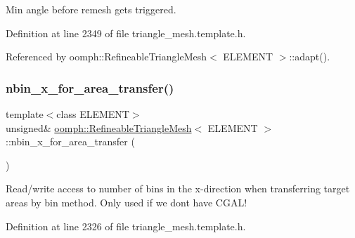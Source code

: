 Min angle before remesh gets triggered. 



Definition at line 2349 of file triangle\+\_\+mesh.\+template.\+h.



Referenced by oomph\+::\+Refineable\+Triangle\+Mesh$<$ E\+L\+E\+M\+E\+N\+T $>$\+::adapt().

\mbox{\label{classoomph_1_1RefineableTriangleMesh_a6c52f0bc155980b2c36fb867ce9ec2d7}} 
\subsubsection{\texorpdfstring{nbin\+\_\+x\+\_\+for\+\_\+area\+\_\+transfer()}{nbin\_x\_for\_area\_transfer()}}
{\footnotesize\ttfamily template$<$class E\+L\+E\+M\+E\+NT$>$ \\
unsigned\& \hyperlink{classoomph_1_1RefineableTriangleMesh}{oomph\+::\+Refineable\+Triangle\+Mesh}$<$ E\+L\+E\+M\+E\+NT $>$\+::nbin\+\_\+x\+\_\+for\+\_\+area\+\_\+transfer (\begin{DoxyParamCaption}{ }\end{DoxyParamCaption})\hspace{0.3cm}{\ttfamily [inline]}}



Read/write access to number of bins in the x-\/direction when transferring target areas by bin method. Only used if we don\textquotesingle{}t have C\+G\+A\+L! 



Definition at line 2326 of file triangle\+\_\+mesh.\+template.\+h.

\mbox{\label{classoomph_1_1RefineableTriangleMesh_a063dc0162d4e352cbbcbbf72b1171f97}} 
